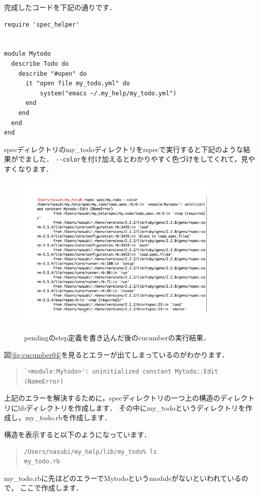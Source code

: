 完成したコードを下記の通りです．
\begin{lstlisting}[style=customRuby,basicstyle={\scriptsize\ttfamily}]
require 'spec_helper'


module Mytodo
  describe Todo do
    describe "#open" do
      it "open file my_todo.yml" do
          system("emacs ~/.my_help/my_todo.yml")
      end
    end
  end
end

\end{lstlisting}
specディレクトリのmy\_todoディレクトリをrspecで実行すると下記のような結果がでました．
\verb|--color|を付け加えるとわかりやすく色づけをしてくれて，見やすくなります．

\begin{figure}[htbp]\begin{center}
\includegraphics[width=10cm,bb= 0 0 737 553]{../figs/./cucumber04.001.jpg}
\caption{pendingのstep定義を書き込んだ後のcucumberの実行結果．}
\label{fig:cucumber04}
\label{default}\end{center}\end{figure}
図\ref{fig:cucumber04}を見るとエラーが出てしまっているのがわかります．
\begin{quote}\begin{verbatim}
`<module:Mytodo>': uninitialized constant Mytodo::Edit (NameError)
\end{verbatim}\end{quote}
上記のエラーを解決するために，specディレクトリの一つ上の構造のディレクトリにlibディレクトリを作成します．
その中にmy\_todoというディレクトリを作成し，my\_todo.rbを作成します．

構造を表示すると以下のようになっています．
\begin{quote}\begin{verbatim}
/Users/nasubi/my_help/lib/my_todo% ls
my_todo.rb
\end{verbatim}\end{quote}
my\_todo.rbに先ほどのエラーでMytodoというmoduleがないといわれているので，
ここで作成します．

